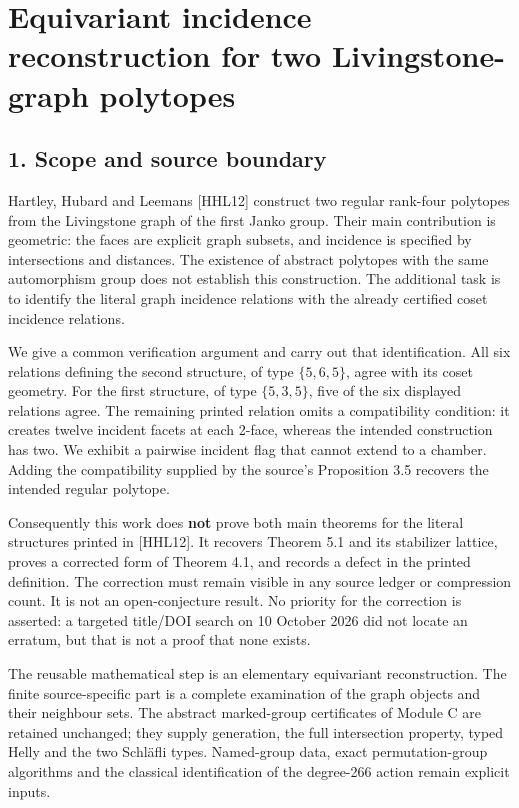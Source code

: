 \documentclass[
  11pt,
  a4paper,
]{article}
\author{}
\date{}
\newcounter{none} %
\begin{document}
\section{Equivariant incidence reconstruction for two Livingstone-graph
polytopes}\label{equivariant-incidence-reconstruction-for-two-livingstone-graph-polytopes}

\subsection{1. Scope and source
boundary}\label{scope-and-source-boundary}

Hartley, Hubard and Leemans {[}HHL12{]} construct two regular rank-four
polytopes from the Livingstone graph of the first Janko group. Their
main contribution is geometric: the faces are explicit graph subsets,
and incidence is specified by intersections and distances. The existence
of abstract polytopes with the same automorphism group does not
establish this construction. The additional task is to identify the
literal graph incidence relations with the already certified coset
incidence relations.

We give a common verification argument and carry out that
identification. All six relations defining the second structure, of type
\(\{5,6,5\}\), agree with its coset geometry. For the first structure,
of type \(\{5,3,5\}\), five of the six displayed relations agree. The
remaining printed relation omits a compatibility condition: it creates
twelve incident facets at each 2-face, whereas the intended construction
has two. We exhibit a pairwise incident flag that cannot extend to a
chamber. Adding the compatibility supplied by the source's Proposition
3.5 recovers the intended regular polytope.

Consequently this work does \textbf{not} prove both main theorems for
the literal structures printed in {[}HHL12{]}. It recovers Theorem 5.1
and its stabilizer lattice, proves a corrected form of Theorem 4.1, and
records a defect in the printed definition. The correction must remain
visible in any source ledger or compression count. It is not an
open-conjecture result. No priority for the correction is asserted: a
targeted title/DOI search on 10 October 2026 did not locate an erratum,
but that is not a proof that none exists.

The reusable mathematical step is an elementary equivariant
reconstruction. The finite source-specific part is a complete
examination of the graph objects and their neighbour sets. The abstract
marked-group certificates of Module C are retained unchanged; they
supply generation, the full intersection property, typed Helly and the
two Schläfli types. Named-group data, exact permutation-group algorithms
and the classical identification of the degree-266 action remain
explicit inputs.
\end{document}
